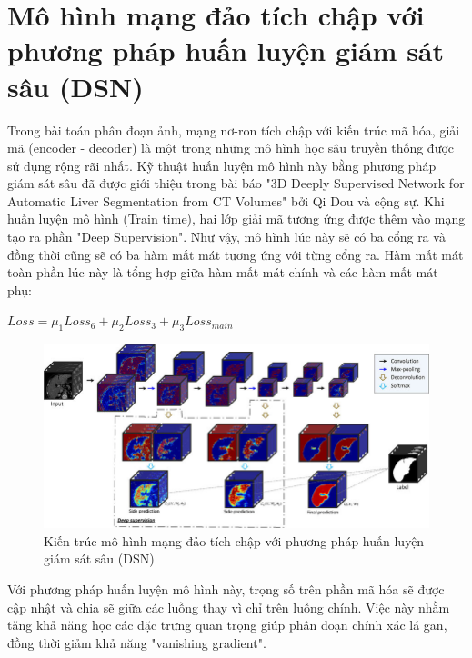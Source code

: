 \section{Mô hình mạng đảo tích chập với phương pháp huấn luyện giám sát sâu (DSN)}
Trong bài toán phân đoạn ảnh, mạng nơ-ron tích chập với kiến trúc mã hóa, giải mã (encoder - decoder) là một trong những mô hình học sâu truyền thống được sử dụng rộng rãi nhất. Kỹ thuật huấn luyện mô hình này bằng phương pháp giám sát sâu đã được giới thiệu trong bài báo "3D Deeply Supervised Network for Automatic Liver Segmentation from CT Volumes" bởi Qi Dou và cộng sự\cite{dsn_paper}.
Khi huấn luyện mô hình (Train time), hai lớp giải mã tương ứng được thêm vào mạng tạo ra phần "Deep Supervision". Như vậy, mô hình lúc này sẽ có ba cổng ra và đồng thời cũng sẽ có ba hàm mất mát tương ứng với từng cổng ra. Hàm mất mát toàn phần lúc này là tổng hợp giữa hàm mất mát chính và các hàm mất mát phụ:\\
\begin{center} $Loss = \mu_1 Loss_{6} + \mu_2 Loss_{3} + \mu_3 Loss_{main}$\end{center}
\begin{figure}[h]
\centering
    \includegraphics[totalheight=8cm]{Images/The-architecture-of-the-proposed-3D-DSN-taking-3D-liver-segmentation-as-an-example.png}
    \caption{Kiến trúc mô hình mạng đảo tích chập với phương pháp huấn luyện giám sát sâu (DSN)}
    \label{DSN}
\end{figure}
Với phương pháp huấn luyện mô hình này, trọng số trên phần mã hóa sẽ được cập nhật và chia sẽ giữa các luồng thay vì chỉ trên luồng chính. Việc này nhằm tăng khả năng học các đặc trưng quan trọng giúp phân đoạn chính xác lá gan, đồng thời giảm khả năng "vanishing gradient".
